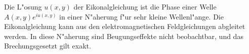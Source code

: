 \begin{diskussion}
Die L"osung $u(x,y)$ der Eikonalgleichung ist die Phase einer Welle
$A(x,y)e^{iu(x,y)}$ in einer N"aherung f"ur sehr kleine Wellenl"ange.
Die Eikonalgleichung kann aus den elektromagnetischen Feldgleichungen
abgleitet werden.
In diese N"aherung sind Beugungseffekte nicht beobachtbar, und das
Brechungsgesetzt gilt exakt.
\end{diskussion}
